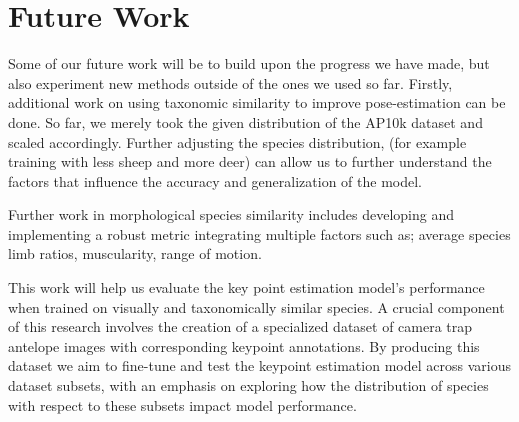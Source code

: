 \documentclass[conference]{IEEEtran}
\begin{document}
\section{Future Work}
Some of our future work will be to build upon the progress we have made, but also experiment new methods outside of the ones we used so far. Firstly, additional work on using taxonomic similarity to improve pose-estimation can be done. So far, we merely took the given distribution of the AP10k dataset and scaled accordingly. Further adjusting the species distribution, (for example training with less sheep and more deer) can allow us to further understand the factors that influence the accuracy and generalization of the model.

Further work in morphological species similarity includes developing and implementing a robust metric integrating multiple factors such as; average species limb ratios, muscularity, range of motion.

This work will help us evaluate the key point estimation model’s performance when trained on visually and taxonomically similar species.
A crucial component of this research involves the creation of a specialized dataset of camera trap antelope images with corresponding keypoint annotations.
By producing this dataset we aim to fine-tune and test the keypoint estimation model across various dataset subsets, with an emphasis on exploring how the distribution of species with respect to these subsets impact model performance.




\end{document}
